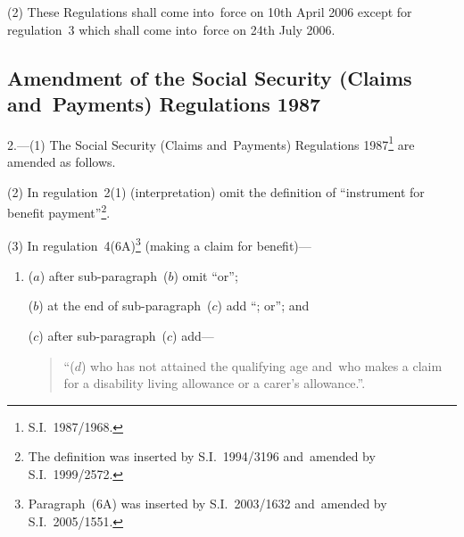 \documentclass[12pt,a4paper]{article}
\begin{document}
(2) These Regulations shall come into~force on 10th April 2006 except for regulation~3 which shall come into~force on 24th July 2006.

\subsection[2. Amendment of the Social Security (Claims and~Payments) Regulations 1987]{Amendment of the Social Security (Claims and~Payments) Regulations 1987}

2.---(1)  The Social Security (Claims and~Payments) Regulations 1987\footnote{S.I.~1987/1968.} are amended as follows.

(2) In regulation~2(1) (interpretation) omit the definition of “instrument for benefit payment”\footnote{The definition was inserted by S.I.~1994/3196 and~amended by S.I.~1999/2572.}.

(3) In regulation~4(6A)\footnote{Paragraph~(6A) was inserted by S.I.~2003/1632 and~amended by S.I.~2005/1551.} (making a claim for benefit)—
\begin{enumerate}\item[]
($a$) after sub-paragraph~($b$)  omit “or”;

($b$) at the end of sub-paragraph~($c$)  add “; or”; and

($c$) after sub-paragraph~($c$)  add—
\begin{quotation}
“($d$) who has not attained the qualifying age and~who makes a claim for a disability living allowance or a carer’s allowance.”.
\end{quotation}
\end{enumerate}
\end{document}
